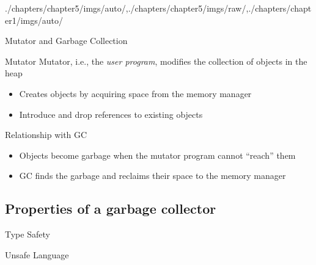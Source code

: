 \begin{graphicspathcontext}{{./chapters/chapter5/imgs/auto/},{./chapters/chapter5/imgs/raw/},{./chapters/chapter1/imgs/auto/}}
\begin{bibunit}[apalike]
\begin{frame}{Mutator and Garbage Collection}
	\begin{definitionblock}{Mutator}
		Mutator, i.e., the \emph{user program}, modifies the collection of objects in the heap
		\begin{itemize}
			\item Creates objects by acquiring space from the memory manager
			\item Introduce and drop references to existing objects
		\end{itemize}
	\end{definitionblock}
	\vspace{1cm}
	\begin{block}{Relationship with GC}
		\begin{itemize}
			\item Objects become garbage when the mutator program cannot ``reach'' them
			\item GC finds the garbage and reclaims their space to the memory manager
		\end{itemize}
	\end{block}
\end{frame}

\subsection{Properties of a garbage collector}
\subsectiontableofcontentslide

\begin{frame}{Type Safety}
	\vspace{.5cm}
	\vspace{.25cm}
	\begin{center}
		\hspace{1cm}
	\end{center}
\end{frame}

\begin{frame}{Unsafe Language}
	\vspace{1cm}
\end{frame}


\end{bibunit}
\end{graphicspathcontext}

